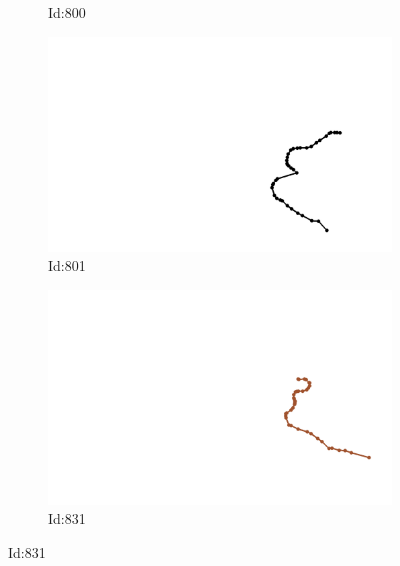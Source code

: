 \documentclass[12pt,twoside]{report}
\begin{document}
\begin{figure}
\begin{subfigure}[b]{0.20\textwidth}
\caption{Id:800}
\end{subfigure}
\begin{subfigure}[b]{0.20\textwidth}
\centering
\includegraphics[width=\textwidth]{../trajectories/801.png}
\caption{Id:801}
\end{subfigure}
\begin{subfigure}[b]{0.20\textwidth}
\centering
\includegraphics[width=\textwidth]{../trajectories/831.png}
\caption{Id:831}
\end{subfigure}
\end{figure}
\end{document}

